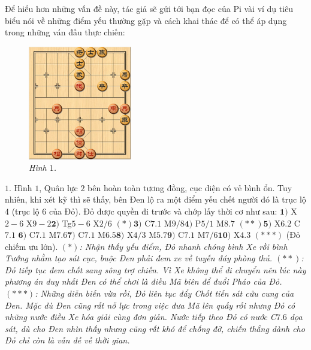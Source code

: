 \begin{multicols}{2}
	Để hiểu hơn những vấn đề này, tác giả sẽ gửi tới bạn đọc của Pi vài ví dụ tiêu biểu nói về những điểm yếu thường gặp và cách khai thác để có thể áp dụng trong những ván đấu thực chiến:
	\begin{figure}[H]
		\vspace*{-5pt}
		\centering
		\captionsetup{labelformat= empty, justification=centering}
		\includegraphics[width= 0.4\textwidth]{1}
		\caption{\small\textit{\color{gocco}Hình $1$.}}
		\vspace*{-10pt}
	\end{figure}
	$1.$ Hình $1$, Quân lực $2$ bên hoàn toàn tương đồng, cục diện có vẻ bình ổn. Tuy nhiên, khi xét kỹ thì sẽ thấy, bên Đen lộ ra một điểm yếu chết người đó là trục lộ $4$ (trục lộ $6$ của Đỏ). Đỏ được quyền đi trước và chớp lấy thời cơ như sau:
	\vskip 0.1cm
	$\pmb{1)}$	X$2-6$ X$9-2$\quad  $\pmb{2)}$ Tg$5-6$ X$2/6$ $(*)$\quad $\pmb{3)}$ C$7.1$ M$9/8$\quad $\pmb{4)}$ P$5/1$ M$8.7$ $(**)$\quad $\pmb{5)}$ X$6.2$ C$7.1$ \quad $\pmb{6)}$ C$7.1$ M$7.6$\quad $\pmb{7)}$ C$7.1$ M$6.5$\quad $\pmb{8)}$ X$4/3$ M$5.7$\quad $\pmb{9)}$ C$7.1$ M$7/6$\quad $\pmb{10)}$ X$4.3$ $(***)$ (Đỏ chiếm ưu lớn).
	\vskip 0.1cm
	\textit{$(*)$: Nhận thấy yếu điểm, Đỏ nhanh chóng bình Xe rồi bình Tướng nhằm tạo sát cục, buộc Đen phải đem xe về tuyến đáy phòng thủ.
	\vskip 0.1cm
	$(**)$: Đỏ tiếp tục đem chốt sang sông trợ chiến. Vì Xe không thể di chuyển nên lúc này phương án duy nhất Đen có thể chơi là điều Mã biên để đuổi Pháo của Đỏ.
	\vskip 0.1cm
	$(***)$: Những diễn biến vừa rồi, Đỏ liên tục đẩy Chốt tiến sát cửu cung của Đen. Mặc dù Đen cũng rất nỗ lực trong việc đưa Mã lên quấy rối nhưng Đỏ có những nước điều Xe hóa giải cùng đơn giản. Nước tiếp theo Đỏ có nước C$7.6$ dọa sát, dù cho Đen nhìn thấy nhưng cũng rất khó để chống đỡ, chiến thắng dành cho Đỏ chỉ còn là vấn đề về thời gian.}
	\begin{figure}[H]
		\vspace*{-5pt}
		\centering
		\captionsetup{labelformat= empty, justification=centering}

\end{figure}
\end{multicols}
